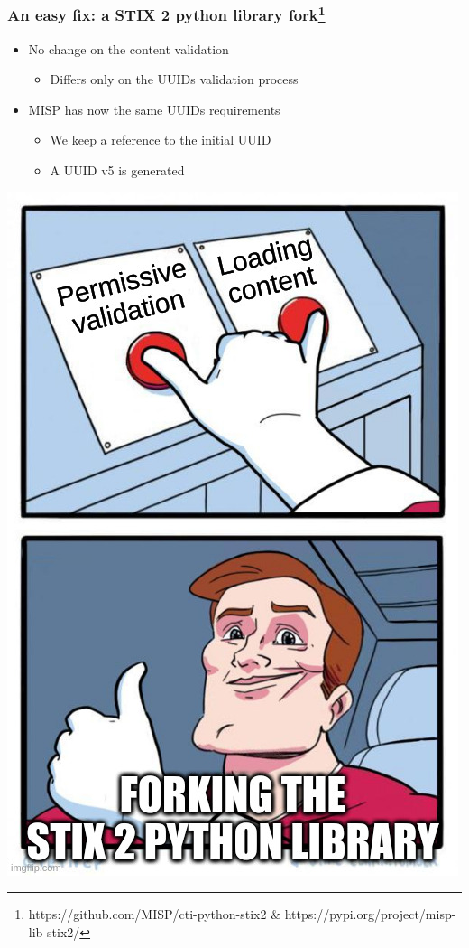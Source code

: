 \begin{frame}
    \frametitle{An easy fix: a STIX 2 python library fork\footnote{https://github.com/MISP/cti-python-stix2 \& https://pypi.org/project/misp-lib-stix2/}}
    \begin{minipage}{0.62\textwidth}
        \begin{itemize}
            \item No change on the content validation
            \begin{itemize}
                \item Differs only on the UUIDs validation process
            \end{itemize}
            \item MISP has now the same UUIDs requirements
            \begin{itemize}
                \item We keep a reference to the initial UUID
                \item A UUID v5 is generated
            \end{itemize}
        \end{itemize}
    \end{minipage}%
    \begin{minipage}{0.38\textwidth}
        \includegraphics[scale=0.25]{images/two_buttons_solution.jpg}
    \end{minipage}
\end{frame}

